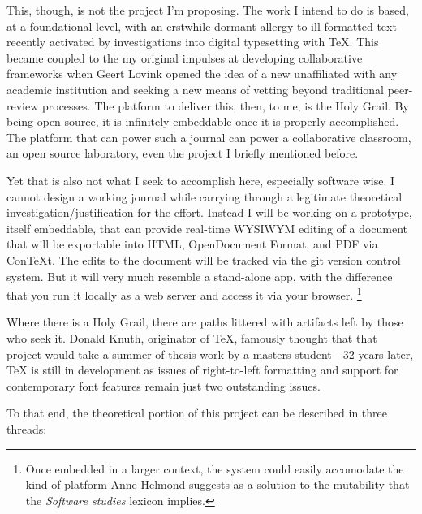 This, though, is not the project I'm proposing. The work I intend
to do is based, at a foundational level, with an erstwhile dormant
allergy to ill-formatted text recently activated by investigations
into digital typesetting with TeX. This became coupled to the my
original impulses at developing collaborative frameworks when Geert
Lovink opened the idea of a new  unaffiliated
with any academic institution and seeking a new means of vetting
beyond traditional peer-review processes. The platform to deliver
this, then, to me, is the Holy Grail. By being open-source, it is
infinitely embeddable once it is properly accomplished. The
platform that can power such a journal can power a collaborative
classroom, an open source laboratory, even the project I briefly
mentioned before.

Yet that is also not what I seek to accomplish here, especially
software wise. I cannot design a working journal while carrying
through a legitimate theoretical investigation/justification for
the effort. Instead I will be working on a prototype, itself
embeddable, that can provide real-time WYSIWYM editing of a
document that will be exportable into HTML, OpenDocument Format,
and PDF via ConTeXt. The edits to the document will be tracked via
the git version control system. But it will very much resemble a
stand-alone app, with the difference that you run it locally as a
web server and access it via your browser.
\footnote{Once embedded in a larger context, the system could easily
accomodate the kind of platform Anne Helmond suggests as a solution
to the mutability that the {\em Software studies} lexicon implies.
\from[1]}

\subject{Whither Theory?}

Where there is a Holy Grail, there are paths littered with
artifacts left by those who seek it. Donald Knuth, originator of
TeX, famously thought that that project would take a summer of
thesis work by a masters student---32 years later, TeX is still in
development as issues of right-to-left formatting and support for
contemporary font features remain just two outstanding issues.

To that end, the theoretical portion of this project can be
described in three threads:


